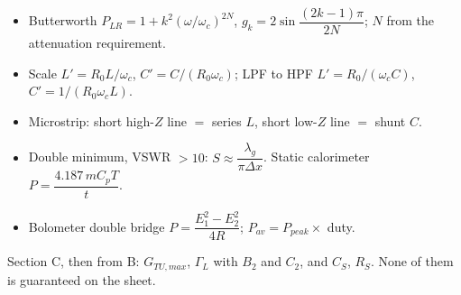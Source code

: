 \begin{itemize}[leftmargin=12pt, itemsep=0.5pt, topsep=1pt]
  \item Butterworth $P_{LR} = 1 + k^2(\omega/\omega_c)^{2N}$,
    $g_k = 2\sin\dfrac{(2k-1)\pi}{2N}$; $N$ from the attenuation requirement.
  \item Scale $L' = R_0L/\omega_c$, $C' = C/(R_0\omega_c)$; LPF to HPF
    $L' = R_0/(\omega_cC)$, $C' = 1/(R_0\omega_cL)$.
  \item Microstrip: short high-$Z$ line $=$ series $L$, short low-$Z$ line $=$ shunt $C$.
\end{itemize}

\begin{itemize}[leftmargin=12pt, itemsep=0.5pt, topsep=1pt]
  \item Double minimum, VSWR $> 10$: $S \approx \dfrac{\lambda_g}{\pi\Delta x}$.
    Static calorimeter $P = \dfrac{4.187\,mC_pT}{t}$.
  \item Bolometer double bridge $P = \dfrac{E_1^2 - E_2^2}{4R}$;
    $P_{av} = P_{peak}\times$ duty.
\end{itemize}

\vspace{3pt}
{\color{sub}\footnotesize {} Section C, then from B: $G_{TU,max}$,
$\Gamma_L$ with $B_2$ and $C_2$, and $C_S$, $R_S$. None of them is guaranteed on the sheet.}
